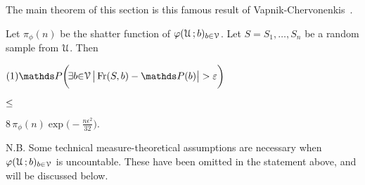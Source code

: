\documentclass[scombinatorics.tex]{subfiles}
\begin{document}
The main theorem of this section is this famous result of Vapnik-Chervonenkis~\cite{VC}.


\def\medrel#1{\parbox[t]{4ex}{$\displaystyle\hfil #1$}}
\def\ceq#1#2#3{\parbox[t]{38ex}{$\displaystyle #1$}\medrel{#2}{$\displaystyle #3$}}

\begin{void_thm}\label{VC_inequality}
  Let $\pi_\phi(n)$ be the shatter function of $\varphi(\EuScript U\,;b)_{b\in\EuScript V}$.
  Let $S=S_1,\dots,S_n$ be a random sample from $\EuScript U$.
  Then

  \ceq{(1)\hfill\Pr\bigg(\!\E b{\in}\V\,\big|\Fr(S,b) - \Pr(b)\big|>\epsilon\bigg)}
  {\le}
  {8\,\pi_\phi(n)\exp\bigg(-\frac{n\epsilon^2}{32}\bigg).}
\end{void_thm}

N.B. Some technical measure-theoretical assumptions are necessary when $\varphi(\EuScript U\,;b)_{b\in\EuScript V}$ is uncountable.
These have been omitted in the statement above, and will be discussed below.
\end{document}
